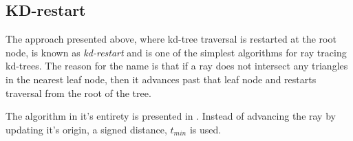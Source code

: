 \begin{figure}
{
    \label{fig:simpleTree}
  }
  \caption[A simple scene and its kd-tree.]{}
  \label{fig:simpleSceneTree}
\end{figure}


\subsection{KD-restart}\label{sec:kdRestart}


The approach presented above, where kd-tree traversal is restarted at
the root node, is known as \textit{kd-restart} and is one of the
simplest algorithms for ray tracing kd-trees. The reason for the name
is that if a ray does not intersect any triangles in the nearest leaf
node, then it advances past that leaf node and restarts traversal from
the root of the tree.


The algorithm in it's entirety is presented in
. Instead of advancing the ray by updating it's
origin, a signed distance, $t_{min}$ is used.

